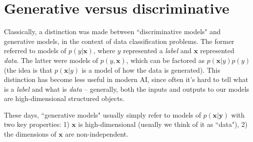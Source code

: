 \section{Generative versus discriminative}
Classically, a distinction was made between ``discriminative models" and generative models, in the context of data classification problems. The former referred to models of $p(y | \mathbf{x})$, where $y$ represented a \emph{label} and $\mathbf{x}$ represented \emph{data}. The latter were models of $p(y, \mathbf{x})$, which can be factored as $p(\mathbf{x} | y)p(y)$ (the idea is that $p(\mathbf{x} | y)$ is a model of how the data is generated). This distinction has become less useful in modern AI, since often it's hard to tell what is a \emph{label} and what is \emph{data} -- generally, both the inputs and outputs to our models are high-dimensional structured objects. %

These days, ``generative models" usually simply refer to models of $p(\mathbf{x}|\mathbf{y})$ with two key properties: 1) $\mathbf{x}$ is high-dimensional (usually we think of it as ``data"), 2) the dimensions of $\mathbf{x}$ are non-independent.





